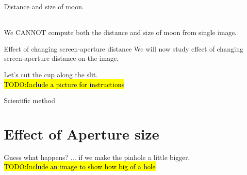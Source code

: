 \begin{frame}{Distance and size of moon.}

  \pause
  \\
  We CANNOT compute both the distance and size of moon from single image.
\end{frame}

\begin{frame}{Effect of changing screen-aperture distance}
  We will now study effect of changing screen-aperture distance on the image.

  Let's cut the cup along the slit.\\
  \hl{TODO:Include a picture for instructions}
\end{frame}

\begin{frame}[fragile]{Scientific method}
  
\end{frame}

\section{Effect of Aperture size}
\begin{frame}{Guess what happens?}
  ... if we make the pinhole a little bigger.\\
  \hl{TODO:Include an image to show how big of a hole}
\end{frame}

